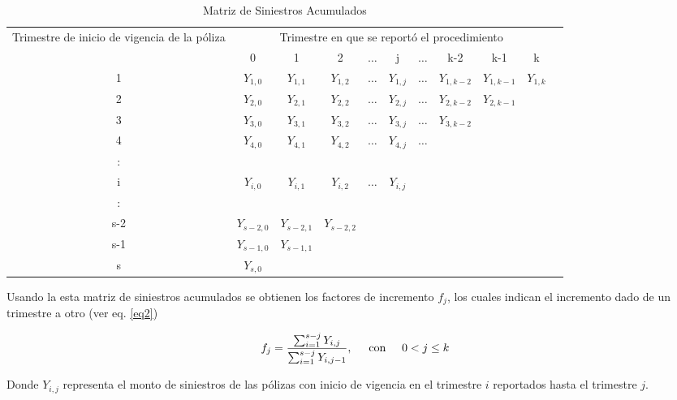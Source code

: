 \documentclass[11pt,twoside,openright,spanish]{report}
\numberwithin{equation}{chapter}
\numberwithin{figure}{chapter}
\numberwithin{table}{chapter}
\begin{document}
	\begin{table}[ht]
	\centering
		
	\begin{tabularx}{\linewidth}{c|cccccccccc}
		\multirow{2}{4cm}{Trimestre de inicio de vigencia de la póliza}&\multicolumn{9}{c}{ Trimestre en que se reportó el procedimiento} \\
		& 0  & 1 & 2 & $ \dots $ & j & $\dots $ & k-2 & k-1 &  k \\
		\midrule
		1      &  $Y_{1,0}^{}$ & $Y_{1,1}^{}$ & $Y_{1,2}^{}$ & $ \dots $ & $Y_{1,j}^{}$ & $ \dots $ & $Y_{1,k-2}^{}$ & $Y_{1,k-1}^{}$ & $Y_{1,k}^{}$ \\
		2      &  $Y_{2,0}^{}$ & $Y_{2,1}^{}$ & $Y_{2,2}^{}$ & $ \dots $ & $Y_{2,j}^{}$ & $ \dots $ & $Y_{2,k-2}^{}$ & $Y_{2,k-1}^{}$ & \\
		3      &  $Y_{3,0}^{}$ & $Y_{3,1}^{}$ & $Y_{3,2}^{}$ & $ \dots $ & $Y_{3,j}^{}$ & $ \dots $ & $Y_{3,k-2}^{}$ & & \\
		4      &  $Y_{4,0}^{}$ & $Y_{4,1}^{}$ & $Y_{4,2}^{}$ & $ \dots $ & $Y_{4,j}^{}$ & $ \dots $ & & & \\
		:      & & & & & & & & &\\
		i      &  $Y_{i,0}^{}$ & $Y_{i,1}^{}$ & $Y_{i,2}^{}$ & $ \dots $ & $Y_{i,j}^{}$ & & & & \\
		:      & & & & & & & & & \\
		s-2      &  $Y_{s-2,0}^{}$ & $Y_{s-2,1}^{}$ & $Y_{s-2,2}^{}$ & & & & & & \\
		s-1      &  $Y_{s-1,0}^{}$ & $Y_{s-1,1}^{}$ & & & & & & & \\
		s      &  $Y_{s,0}^{}$ & & & & & & & & \\
	\end{tabularx}
\caption{Matriz de Siniestros Acumulados}
\label{matrix2}
	\end{table} 
	
	
	Usando la esta matriz de siniestros acumulados se obtienen los factores de incremento ${f}_{j}$, los cuales indican el incremento dado de un trimestre a otro (ver eq. \ref{eq2})

	\begin{equation}
	{f}_{j}=\frac{\sum _{i=1}^{s-j}{Y}_{i,j}}{\sum _{i=1}^{s-j}{Y}_{i,j-1}}, \hspace{0.5cm}\text{con}\hspace{0.5cm} 0< j\le k
	\label{eq2}
	\end{equation}

	Donde ${Y}_{i,j}$ representa el monto de siniestros de las pólizas con inicio de vigencia en el trimestre $i$ reportados hasta el trimestre $j$.
\end{document}
